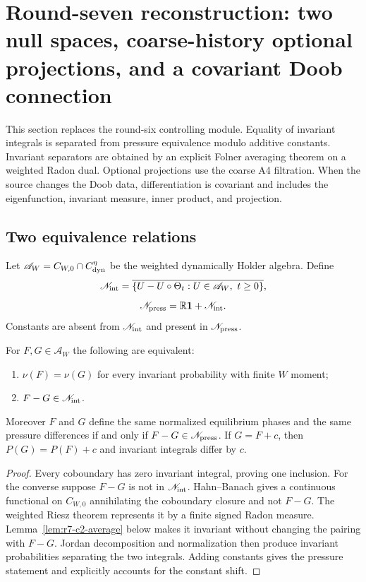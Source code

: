 \section{Round-seven reconstruction: two null spaces, coarse-history optional projections, and a covariant Doob connection}
\label{sec:r7-c2}

This section replaces the round-six controlling module.  Equality of invariant
integrals is separated from pressure equivalence modulo additive constants.
Invariant separators are obtained by an explicit Folner averaging theorem on a
weighted Radon dual.  Optional projections use the coarse A4 filtration.  When
the source changes the Doob data, differentiation is covariant and includes
the eigenfunction, invariant measure, inner product, and projection.

\subsection{Two equivalence relations}

Let $\mathscr A_W=C_{W,0}\cap C^\eta_{\rm dyn}$ be the weighted dynamically
Holder algebra.  Define
\[
 \mathscr N_{\rm int}=
 \overline{\{U-U\circ\Theta_t:U\in\mathscr A_W,\ t\ge0\}},
\]
\[
 \mathscr N_{\rm press}=
 \mathbb R\mathbf1+\mathscr N_{\rm int}.
\]
Constants are absent from $\mathscr N_{\rm int}$ and present in
$\mathscr N_{\rm press}$.

\begin{theorem}
\label{thm:r7-c2-cotangent}
For $F,G\in\mathscr A_W$ the following are equivalent:
\begin{enumerate}[label=(\roman*)]
\item $\nu(F)=\nu(G)$ for every invariant probability with finite $W$ moment;
\item $F-G\in\mathscr N_{\rm int}$.
\end{enumerate}
Moreover $F$ and $G$ define the same normalized equilibrium phases and the
same pressure differences if and only if
$F-G\in\mathscr N_{\rm press}$.  If $G=F+c$, then
$P(G)=P(F)+c$ and invariant integrals differ by $c$.
\end{theorem}

\begin{proof}
Every coboundary has zero invariant integral, proving one inclusion.  For the
converse suppose $F-G$ is not in $\mathscr N_{\rm int}$.  Hahn--Banach gives a
continuous functional on $C_{W,0}$ annihilating the coboundary closure and not
$F-G$.  The weighted Riesz theorem represents it by a finite signed Radon
measure.  Lemma~\ref{lem:r7-c2-average} below makes it invariant without
changing the pairing with $F-G$.  Jordan decomposition and normalization then
produce invariant probabilities separating the two integrals.  Adding
constants gives the pressure statement and explicitly accounts for the
constant shift.
\end{proof}

